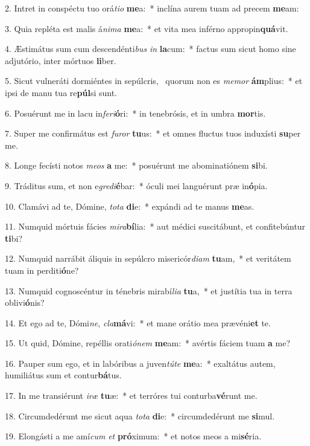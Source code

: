 2. Intret in conspéctu tuo orá\textit{ti}\textit{o} \textbf{me}a:~*  inclína aurem tuam ad precem \textbf{me}am:\

3. Quia repléta est malis á\textit{ni}\textit{ma} \textbf{me}a:~*  et vita mea inférno appropin\textbf{quá}vit.\

4. Æstimátus sum cum descendénti\textit{bus} \textit{in} \textbf{la}cum:~*  factus sum sicut homo sine adjutório, inter mórtuos \textbf{li}ber.\

5. Sicut vulneráti dormiéntes in sepúlcris, \dag\  quorum non es \textit{me}\textit{mor} \textbf{ám}plius:~*  et ipsi de manu tua re\textbf{púl}si sunt.\

6. Posuérunt me in lacu in\textit{fe}\textit{ri}\textbf{ó}ri:~*  in tenebrósis, et in umbra \textbf{mor}tis.\

7. Super me confirmátus est \textit{fu}\textit{ror} \textbf{tu}us:~*  et omnes fluctus tuos induxísti \textbf{su}per me.\

8. Longe fecísti notos \textit{me}\textit{os} \textbf{a} me:~*  posuérunt me abominatiónem \textbf{si}bi.\

9. Tráditus sum, et non e\textit{gre}\textit{di}\textbf{é}bar:~*  óculi mei languérunt præ in\textbf{ó}pia.\

10. Clamávi ad te, Dómine, \textit{to}\textit{ta} \textbf{di}e:~*  expándi ad te manus \textbf{me}as.\

11. Numquid mórtuis fácies \textit{mi}\textit{ra}\textbf{bí}lia:~*  aut médici suscitábunt, et confitebúntur \textbf{ti}bi?\

12. Numquid narrábit áliquis in sepúlcro misericór\textit{di}\textit{am} \textbf{tu}am,~*  et veritátem tuam in perditi\textbf{ó}ne?\

13. Numquid cognoscéntur in ténebris mirabí\textit{li}\textit{a} \textbf{tu}a,~*  et justítia tua in terra oblivi\textbf{ó}nis?\

14. Et ego ad te, Dómi\textit{ne}, \textit{cla}\textbf{má}vi:~*  et mane orátio mea prævéni\textbf{et} te.\

15. Ut quid, Dómine, repéllis orati\textit{ó}\textit{nem} \textbf{me}am:~*  avértis fáciem tuam \textbf{a} me?\

16. Pauper sum ego, et in labóribus a juven\textit{tú}\textit{te} \textbf{me}a:~*  exaltátus autem, humiliátus sum et contur\textbf{bá}tus.\

17. In me transiérunt \textit{i}\textit{ræ} \textbf{tu}æ:~*  et terróres tui conturba\textbf{vé}runt me.\

18. Circumdedérunt me sicut aqua \textit{to}\textit{ta} \textbf{di}e:~*  circumdedérunt me \textbf{si}mul.\

19. Elongásti a me amí\textit{cum} \textit{et} \textbf{pró}ximum:~*  et notos meos a mi\textbf{sé}ria.\

